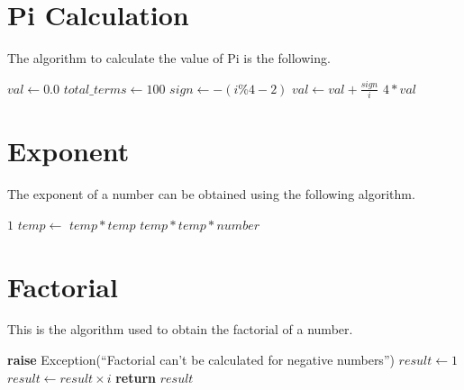 \documentclass{report}
\begin{document}
\section{Pi Calculation}
\begin{flushleft}
  The algorithm to calculate the value of Pi is the following.
\end{flushleft}
\begin{algorithmic}[1]
        \State $val \gets 0.0$
        \State $total\_terms \gets 100$
            \State $sign \gets -(i\%4-2)$
            \State $val \gets val + \frac{sign}{i}$
        \EndFor
        \State \Return $4 * val$
    \EndFunction
\end{algorithmic}

\section{Exponent}
\begin{flushleft}
The exponent of a number can be obtained using the following algorithm.
\end{flushleft}
\begin{algorithmic}[1]
        \State \Return $1$
    \EndIf
    \State $temp \gets$ 
        \State \Return $temp * temp$
    \Else
        \State \Return $temp * temp * number$
    \EndIf
\EndFunction
\end{algorithmic}

\section{Factorial}
\begin{flushleft}
This is the algorithm used to obtain the factorial of a number.
\end{flushleft}
\begin{algorithmic}[1]
    \State \textbf{raise} Exception(``Factorial can't be calculated for negative numbers'')
  \EndIf
  \State $result \gets 1$
    \State $result \gets result \times i$
  \EndFor
  \State \textbf{return} $result$
\EndFunction
\end{algorithmic}



\printindex
\end{document}
